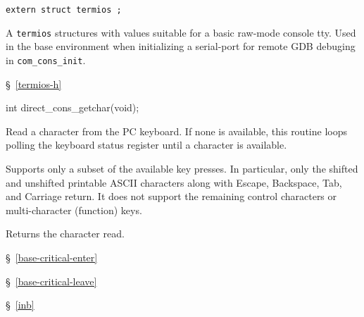 \label{base-raw-termios}
\begin{apisyn}

	{\tt extern struct termios ;}
\end{apisyn}
\begin{apidesc}
	A \posix{} {\tt termios} structures with values suitable for a
	basic raw-mode console tty.
	Used in the base environment when initializing a serial-port
	for remote GDB debuging in {\tt com_cons_init}.
\end{apidesc}
\begin{apidep}
	\item[termios.h]	\S~\ref{termios-h}
\end{apidep}

\label{direct-cons-getchar}
\begin{apisyn}

	\funcproto int direct_cons_getchar(void);
\end{apisyn}
\begin{apidesc}
	Read a character from the PC keyboard.
	If none is available, this routine loops polling the keyboard status
	register until a character is available.

	Supports only a subset of the available key presses.
	In particular, only the shifted and unshifted printable ASCII
	characters along with Escape, Backspace, Tab, and Carriage return.
	It does not support the remaining control characters or multi-character
	(function) keys.
\end{apidesc}
\begin{apiret}
	Returns the character read.
\end{apiret}
\begin{apidep}
	\item[base_critical_enter]	\S~\ref{base-critical-enter}
	\item[base_critical_leave]	\S~\ref{base-critical-leave}
	\item[inb]	\S~\ref{inb}
\end{apidep}

